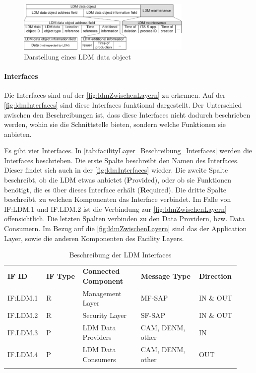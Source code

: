 \begin{figure}[htbp]
	\includegraphics[width=0.75\textwidth]{content/images/04_facilitylayer/LDMdataObject.png}
	\caption{Darstellung eines LDM data object  \cite{LDMdataobject}}
	\label{fig:ldmdataObject}
\end{figure}

\paragraph{Interfaces}
Die Interfaces sind auf der \autoref{fig:ldmZwischenLayern} zu erkennen. Auf der \autoref{fig:ldmInterfaces} sind diese Interfaces funktional dargestellt. Der Unterschied zwischen den Beschreibungen ist, dass diese Interfaces nicht dadurch beschrieben werden, wohin sie die Schnittstelle bieten, sondern welche Funktionen sie anbieten.

Es gibt vier Interfaces. In \autoref{tab:facilityLayer_Beschreibung_Interfaces} werden die Interfaces beschrieben. Die erste Spalte beschreibt den Namen des Interfaces. Dieser findet sich auch in der \autoref{fig:ldmInterfaces} wieder. Die zweite Spalte beschreibt, ob die \ac{LDM} etwas anbietet (\textbf{P}rovided), oder ob sie Funktionen benötigt, die es über dieses Interface erhält (\textbf{R}equired). Die dritte Spalte beschreibt, zu welchen Komponenten das Interface verbindet. Im Falle von IF:LDM.1 und IF.LDM.2 ist die Verbindung zur \autoref{fig:ldmZwischenLayern} offensichtlich. Die letzten Spalten verbinden zu den Data Providern, bzw. Data Consumern. Im Bezug auf die \autoref{fig:ldmZwischenLayern} sind das der Application Layer, sowie die anderen Komponenten des Facility Layers. 

 \begin{longtable}{| p{0.15\linewidth} | p{0.15\linewidth} | p{0.24\linewidth} |p{0.24\linewidth}| p{0.15\linewidth}|}
 \hline
 \textbf{IF ID} & \textbf{IF Type} & \textbf{Connected Component} &  \textbf{Message Type}&\textbf{Direction} \\
IF:LDM.1 & R & Management Layer & MF-SAP & IN \& OUT \\
\hline
IF.LDM.2 & R & Security Layer & SF-SAP & IN \& OUT \\
\hline
IF.LDM.3 & P & LDM Data Providers & CAM, DENM, other & IN \\
\hline
IF.LDM.4 & P & LDM Data Consumers & CAM, DENM, other & OUT \\
\hline 
\caption{Beschreibung der LDM Interfaces \cite{en302895}}
\label{tab:facilityLayer_Beschreibung_Interfaces}
\end{longtable}

